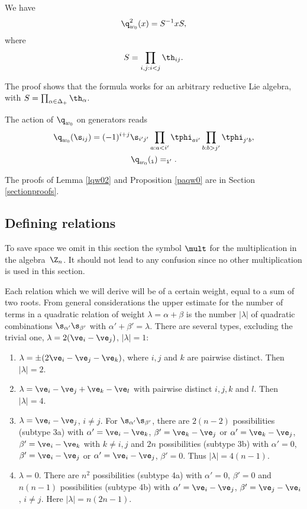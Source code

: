 \begin{lem}\label{lqw02}
We have
\begin{gather}\label{qw02}
\q_{w_0}^2(x)=S^{-1}xS  ,
\end{gather}
where
\begin{gather}
 S=\prod_{i,j:i<j}\th_{ij}  .\label{conjq02}
 \end{gather}
\end{lem}

The proof shows that the formula  works for an arbitrary reductive Lie algebra, with $S=\prod_{\alpha\in \Delta_+}\th_{\alpha}$.

\begin{prop}\label{paqw0}
The action of $\q_{w_0}$ on generators reads
\begin{gather}
 \label{3.6}
 \q_{w_0}(\s_{ij})=(-1)^{i+j} \s_{i'j'}\prod_{a:a<i'}\tphi_{ai'}
\prod_{b:b>j'}\tphi_{j'b} ,\\
\q_{w_0}(\tt_i)=\tt_{i'} .\label{3.6a}
\end{gather}
\end{prop}

The proofs of Lemma \ref{lqw02} and Proposition \ref{paqw0} are in Section \ref{sectionproofs}.

\subsection{Def\/ining relations}\label{section3.3}

To save  space we omit in this section the symbol $\mult$ for the multiplication in the algebra~$\Z_n$. It should not lead to any confusion since no other multiplication is used in this section.


Each relation which we will derive will be of a certain weight, equal to a sum of two roots. From general considerations the upper estimate
for the number of terms in a quadratic relation of weight $\lambda=\alpha+\beta$ is the number $|\lambda|$ of quadratic combinations $\s_{\alpha'}\s_{\beta'}$
with $\alpha'+\beta'=\lambda$.
There are several types, excluding the trivial one, $\lambda=2(\ve_i-\ve_j)$, $|\lambda|=1$:
\begin{enumerate}\itemsep=0pt
\item $\lambda=\pm(2\ve_i-\ve_j-\ve_k)$, where $i,j$ and $k$ are pairwise distinct. Then $|\lambda|=2$.
\item $\lambda=\ve_i-\ve_j+\ve_k-\ve_l$ with pairwise distinct $i,j,k$ and $l$. Then $|\lambda|=4$.
\item $\lambda=\ve_i-\ve_j$, $i\neq j$. For $\s_{\alpha'}\s_{\beta'}$, there are $2(n-2)$ possibilities (subtype 3a) with $\alpha'=\ve_i-\ve_k$,
$\beta'=\ve_k-\ve_j$ or $\alpha'=\ve_k-\ve_j$, $\beta'=\ve_i-\ve_k$ with $k\neq i,j$ and $2n$ possibilities (subtype 3b) with $\alpha'=0$,
$\beta'=\ve_i-\ve_j$ or $\alpha'=\ve_i-\ve_j$, $\beta'=0$. Thus $|\lambda|=4(n-1)$.
\item $\lambda=0$. There are $n^2$ possibilities (subtype 4a) with $\alpha'=0$, $\beta'=0$ and $n(n-1)$ possibilities (subtype 4b) with
$\alpha'=\ve_i-\ve_j$,  $\beta'=\ve_j-\ve_i$, $i\neq j$. Here $|\lambda|=n(2n-1)$.
\end{enumerate}

